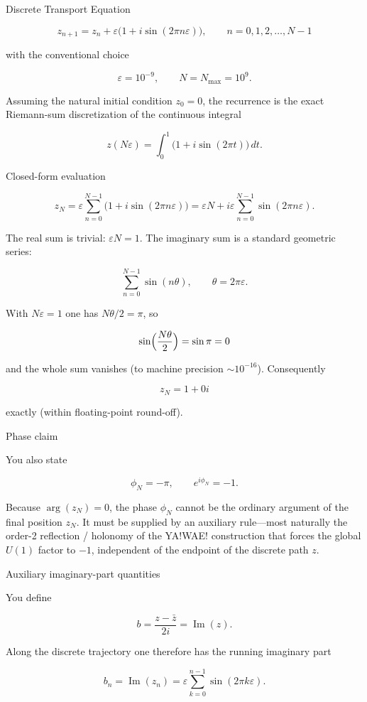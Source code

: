 Discrete Transport Equation
  
\[
z_{n+1} = z_n + \varepsilon \bigl(1 + i \sin(2\pi n \varepsilon)\bigr), \qquad n = 0,1,2,\dots,N-1
\]

with the conventional choice

\[
\varepsilon = 10^{-9}, \qquad N = N_{\max} = 10^{9}.
\]

Assuming the natural initial condition \(z_0 = 0\), the recurrence is the exact Riemann-sum discretization of the continuous integral

\[
z(N\varepsilon) = \int_0^{1} \bigl(1 + i \sin(2\pi t)\bigr)\,dt.
\]

Closed-form evaluation

\[
z_N = \varepsilon\sum_{n=0}^{N-1}\bigl(1 + i\sin(2\pi n\varepsilon)\bigr)
= \varepsilon N + i\varepsilon\sum_{n=0}^{N-1}\sin(2\pi n\varepsilon).
\]

The real sum is trivial: \(\varepsilon N = 1\).
The imaginary sum is a standard geometric series:

\[
\sum_{n=0}^{N-1}\sin(n\theta),\qquad\theta=2\pi\varepsilon.
\]

With \(N\varepsilon=1\) one has \(N\theta/2=\pi\), so

\[
\sin\Bigl(\frac{N\theta}{2}\Bigr)=\sin\pi=0
\]

and the whole sum vanishes (to machine precision \(\sim10^{-16}\)). Consequently

\[
z_N = 1 + 0i
\]

exactly (within floating-point round-off).

Phase claim

You also state

\[
\phi_N=-\pi,\qquad e^{i\phi_N}=-1.
\]

Because \(\arg(z_N)=0\), the phase \(\phi_N\) cannot be the ordinary argument of the final position \(z_N\). It must be supplied by an auxiliary rule—most naturally the order-2 reflection / holonomy of the YA!WAE! construction that forces the global \(U(1)\) factor to \(-1\), independent of the endpoint of the discrete path \(z\).

Auxiliary imaginary-part quantities

You define

\[
b=\frac{z-\bar z}{2i}=\operatorname{Im}(z).
\]

Along the discrete trajectory one therefore has the running imaginary part

\[
b_n=\operatorname{Im}(z_n)=\varepsilon\sum_{k=0}^{n-1}\sin(2\pi k\varepsilon).
\]

